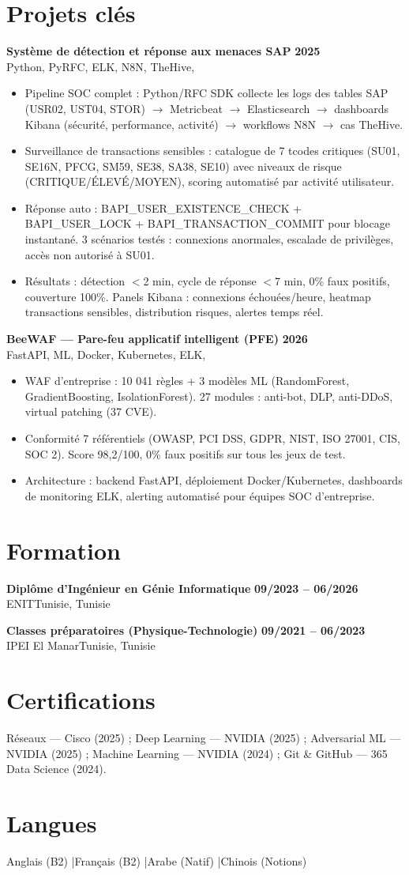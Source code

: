 \documentclass[a4paper,10pt]{article}
\newcommand{\cventry}[4]{\textbf{#1} \hfill \textbf{#4}\\[1pt]#2{\ifx\relax#3\relax\else, #3\fi}\par\vspace{1pt}}
\begin{document}
\section{Projets clés}
\cventry{Système de détection et réponse aux menaces SAP}{Python, PyRFC, ELK, N8N, TheHive}{}{2025}
\begin{itemize}
  \item Pipeline SOC complet : Python/RFC SDK collecte les logs des tables SAP (USR02, UST04, STOR) $\rightarrow$ Metricbeat $\rightarrow$ Elasticsearch $\rightarrow$ dashboards Kibana (sécurité, performance, activité) $\rightarrow$ workflows N8N $\rightarrow$ cas TheHive.
  \item Surveillance de transactions sensibles : catalogue de 7 tcodes critiques (SU01, SE16N, PFCG, SM59, SE38, SA38, SE10) avec niveaux de risque (CRITIQUE/ÉLEVÉ/MOYEN), scoring automatisé par activité utilisateur.
  \item Réponse auto : BAPI\_USER\_EXISTENCE\_CHECK + BAPI\_USER\_LOCK + BAPI\_TRANSACTION\_COMMIT pour blocage instantané. 3 scénarios testés : connexions anormales, escalade de privilèges, accès non autorisé à SU01.
  \item Résultats : détection $<$2 min, cycle de réponse $<$7 min, 0\% faux positifs, couverture 100\%. Panels Kibana : connexions échouées/heure, heatmap transactions sensibles, distribution risques, alertes temps réel.
\end{itemize}
\cventry{BeeWAF --- Pare-feu applicatif intelligent (PFE)}{FastAPI, ML, Docker, Kubernetes, ELK}{}{2026}
\begin{itemize}
  \item WAF d'entreprise : 10 041 règles + 3 modèles ML (RandomForest, GradientBoosting, IsolationForest). 27 modules : anti-bot, DLP, anti-DDoS, virtual patching (37 CVE).
  \item Conformité 7 référentiels (OWASP, PCI DSS, GDPR, NIST, ISO 27001, CIS, SOC 2). Score 98,2/100, 0\% faux positifs sur tous les jeux de test.
  \item Architecture : backend FastAPI, déploiement Docker/Kubernetes, dashboards de monitoring ELK, alerting automatisé pour équipes SOC d'entreprise.
\end{itemize}
\section{Formation}
\cventry{Diplôme d'Ingénieur en Génie Informatique}{ENIT}{Tunisie}{09/2023 -- 06/2026}
\cventry{Classes préparatoires (Physique-Technologie)}{IPEI El Manar}{Tunisie}{09/2021 -- 06/2023}
\section{Certifications}
Réseaux --- Cisco (2025) ; Deep Learning --- NVIDIA (2025) ; Adversarial ML --- NVIDIA (2025) ; Machine Learning --- NVIDIA (2024) ; Git \& GitHub --- 365 Data Science (2024).
\section{Langues}
Anglais (B2) \quad|\quad Français (B2) \quad|\quad Arabe (Natif) \quad|\quad Chinois (Notions)
\end{document}
